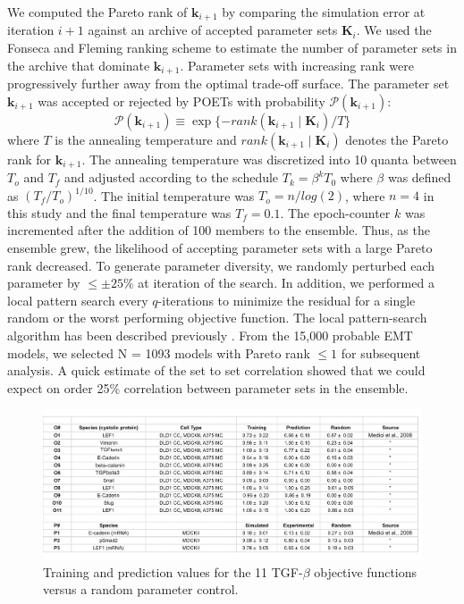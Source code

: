 We computed the Pareto rank of $\mathbf{k}_{i+1}$ by comparing the simulation error at iteration $i+1$ against an archive of accepted parameter sets $\mathbf{K}_{i}$.
We used the Fonseca and Fleming ranking scheme \cite{fonseca1993genetic} to estimate the number of parameter sets in the archive that dominate
$\mathbf{k}_{i+1}$. Parameter sets with increasing rank were progressively further away from the optimal trade-off surface.
The parameter set $\mathbf{k}_{i+1}$ was accepted or rejected by POETs with probability $\mathcal{P}\left(\mathbf{k}_{i+1}\right)$:
\begin{equation}\label{eqn_costMOSA}
\mathcal{P}(\mathbf{k}_{i+1}) \equiv \exp{\{-rank\left(\mathbf{k}_{i+1} \mid \mathbf{K}_{i} \right)/T\}}
\end{equation}
where $T$ is the annealing temperature and $rank\left(\mathbf{k}_{i+1} \mid \mathbf{K}_{i} \right)$ denotes the Pareto rank for $\mathbf{k}_{i+1}$.
The annealing temperature was discretized into 10 quanta between $T_{o}$ and $T_{f}$ and adjusted according to the schedule
$T_k = \beta^k T_0$ where $\beta$ was defined as $\left({T_{f}}/{T_{o}}\right)^{1/10}$.
The initial temperature was $T_{o} = \mathit{n}/log(2)$, where $n = 4$ in this study and the final temperature was $T_{f} = 0.1$.
The epoch-counter $k$ was incremented after the addition of 100 members to the ensemble.
Thus, as the ensemble grew, the likelihood of accepting parameter sets with a large Pareto rank decreased.
To generate parameter diversity, we randomly perturbed each parameter by $\leq\pm25\%$ at iteration of the search.
In addition, we performed a local pattern search every $q$-iterations to minimize the residual for a single random or the worst performing objective function.
The local pattern-search algorithm has been described previously \cite{gadkar2003cybernetic}.
From the 15,000 probable EMT models, we selected N = 1093 models with Pareto rank $\leq{1}$ for subsequent analysis.
A quick estimate of the set to set correlation showed that we could expect on order 25\% correlation between parameter sets in the ensemble.

\begin{figure}
\includegraphics [width=1.0\linewidth] {./figs/Fig-5-Supplemental-ErrorTable.pdf}
\caption{Training and prediction values for the 11 TGF-$\beta$ objective functions versus a random parameter control.}\label{fig:S5}
\end{figure}

